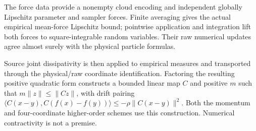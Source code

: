 \documentclass[11pt,a4paper]{report}
\begin{document}
The force data provide a nonempty cloud encoding and independent globally Lipschitz parameter and sampler forces. Finite averaging gives the actual empirical mean-force Lipschitz bound; pointwise application and integration lift both forces to square-integrable random variables. Their raw numerical updates agree almost surely with the physical particle formulas.



Source joint dissipativity is then applied to empirical measures and transported through the physical/\allowbreak{}raw coordinate identification. Factoring the resulting positive quadratic form constructs a bounded linear map \(C\) and positive \(m\) such that \(m\|z\|\le\|Cz\|\), with drift pairing \(\langle C(x-y),C(f(x)-f(y))\rangle\le-\rho\|C(x-y)\|^2\). Both the momentum and four-coordinate higher-order schemes use this construction. Numerical contractivity is not a premise.
\end{document}
